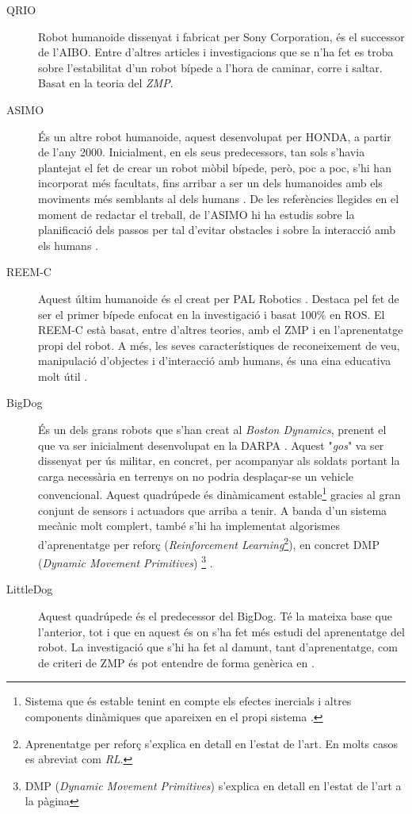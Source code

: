 \documentclass[12pt,a4paper,final,twoside]{article}
\begin{document}
\begin{description}

\item[QRIO] Robot humanoide dissenyat i fabricat per Sony Corporation, és el successor de l'AIBO. Entre d'altres articles i investigacions que se n'ha fet es troba \cite{Nagasaka2004} sobre l'estabilitat d'un robot bípede a l'hora de caminar, corre i saltar. Basat en la teoria del \textit{ZMP}.

\item[ASIMO] És un altre robot humanoide, aquest desenvolupat per HONDA, a partir de l'any 2000. Inicialment, en els seus predecessors, tan sols s'havia plantejat el fet de crear un robot mòbil bípede, però, poc a poc, s'hi han incorporat més facultats, fins arribar a ser un dels humanoides amb els moviments més semblants al dels humans \cite{ASIMO_History}. De les referències llegides en el moment de redactar el treball, de l'ASIMO hi ha estudis sobre la planificació dels passos per tal d'evitar obstacles \cite{Chestnutt2005} i sobre la interacció amb els humans \cite{Mutlu2006}.

\item[REEM-C] Aquest últim humanoide és el creat per PAL Robotics \cite{REEM_C}. Destaca pel fet de ser el primer bípede enfocat en la investigació i basat 100\% en ROS. El REEM-C està basat, entre d'altres teories, amb el ZMP i en l'aprenentatge propi del robot. A més, les seves característiques de reconeixement de veu, manipulació d'objectes i d'interacció amb humans, és una eina educativa molt útil \cite{Robotics}.

\item[BigDog] És un dels grans robots que s'han creat al \textit{Boston Dynamics}, prenent el que va ser inicialment desenvolupat en la DARPA \cite{Marc2008}. Aquest "\textit{gos}" va ser dissenyat per ús militar, en concret, per acompanyar als soldats portant la carga necessària en terrenys on no podria desplaçar-se un vehicle convencional. Aquest quadrúpede és dinàmicament estable\footnote{Sistema que és estable tenint en compte els efectes inercials i altres components dinàmiques que apareixen en el propi sistema \cite{Purushotham2009}.} gracies al gran conjunt de sensors i actuadors que arriba a tenir. A banda d'un sistema mecànic molt complert, també s'hi ha implementat algorismes d'aprenentatge per reforç (\textit{Reinforcement Learning}\footnote{Aprenentatge per reforç s'explica en detall en l'estat de l'art. En molts casos es abreviat com \textit{RL}.}), en concret DMP (\textit{Dynamic Movement Primitives}) \footnote{DMP (\textit{Dynamic Movement Primitives}) s'explica en detall en l'estat de l'art a la pàgina \pageref{DMP-estat-de-l'art} } \cite{Playter2006}.

\item[LittleDog] Aquest quadrúpede és el predecessor del BigDog. Té la mateixa base que l'anterior, tot i que en aquest és on s'ha fet més estudi del aprenentatge del robot. La investigació que s'hi ha fet al damunt, tant d'aprenentatge, com de criteri de ZMP és pot entendre de forma genèrica en \cite{Kalakrishnan2010}. 

\end{description}
\end{document}
